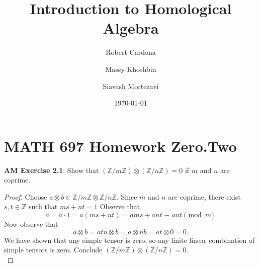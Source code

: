 \documentclass[8pt]{amsart}
\theoremstyle{plain}%
\theoremstyle{definition}
\theoremstyle{remark}
\numberwithin{equation}{section}
\newcommand{\Z}{\mathbb{Z}}
\begin{document}
\title[MATH 697]{Introduction to Homological Algebra}


\author{
	Robert Cardona %
	\and
	Massy Khoshbin %
	\and
	Siavash Mortezavi %
}


\address{Department of Mathematics \\ California State University Long Beach}

\date{\today}


\maketitle

\setcounter{section}{-1}
\section{MATH 697 Homework Zero.Two}


\textbf{ AM Exercise 2.1}: Show that $(\Z/m\Z) \otimes (\Z/n\Z) = 0$ if $m$ and $n$ are coprime.
	\begin{proof}
		Choose $a \otimes b \in \Z/m\Z \otimes \Z/n\Z$. Since $m$ and $n$ are coprime, there exist $s, t \in \Z$ such that $ms + nt = 1$ Observe that $$a = a \cdot 1 = a(ms + nt) = ams + ant \equiv ant \pmod m.$$ Now observe that $$a \otimes b = atn \otimes b = a \otimes nb = at \otimes 0 = 0.$$
		We have shown that any simple tensor is zero, so any finite linear combination of simple tensors is zero. Conclude $(\Z/m\Z) \otimes (\Z/n\Z) = 0$.\\
	\end{proof}
\end{document}
